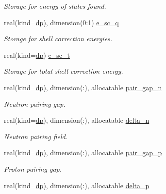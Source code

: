 \begin{DoxyCompactItemize}
\begin{DoxyCompactList}\small\item\em Storage for energy of states found. \end{DoxyCompactList}\item 
real(kind=\mbox{\hyperlink{namespaceparameters_a52f8c6351fd79345d8811e065bcbbb37}{dp}}), dimension(0\+:1) \mbox{\hyperlink{group__STRUTINSKY_ga8f402c8fe224c0fa1965b57701b6e597}{e\+\_\+sc\+\_\+q}}
\begin{DoxyCompactList}\small\item\em Storage for shell correction energies. \end{DoxyCompactList}\item 
real(kind=\mbox{\hyperlink{namespaceparameters_a52f8c6351fd79345d8811e065bcbbb37}{dp}}) \mbox{\hyperlink{group__STRUTINSKY_ga48fd0dbdf687c86420599443535e70c8}{e\+\_\+sc\+\_\+t}}
\begin{DoxyCompactList}\small\item\em Storage for total shell correction energy. \end{DoxyCompactList}\item 
real(kind=\mbox{\hyperlink{namespaceparameters_a52f8c6351fd79345d8811e065bcbbb37}{dp}}), dimension(\+:), allocatable \mbox{\hyperlink{group__PAIRING_ga2017e6d9cb3446579e4231db5ee50d0c}{pair\+\_\+gap\+\_\+n}}
\begin{DoxyCompactList}\small\item\em Neutron pairing gap. \end{DoxyCompactList}\item 
real(kind=\mbox{\hyperlink{namespaceparameters_a52f8c6351fd79345d8811e065bcbbb37}{dp}}), dimension(\+:), allocatable \mbox{\hyperlink{group__PAIRING_ga1a7cf61c64e34d8c4ff1348bea510826}{delta\+\_\+n}}
\begin{DoxyCompactList}\small\item\em Neutron pairing field. \end{DoxyCompactList}\item 
real(kind=\mbox{\hyperlink{namespaceparameters_a52f8c6351fd79345d8811e065bcbbb37}{dp}}), dimension(\+:), allocatable \mbox{\hyperlink{group__PAIRING_ga80c6085ca6be5adceadc0f7167218231}{pair\+\_\+gap\+\_\+p}}
\begin{DoxyCompactList}\small\item\em Proton pairing gap. \end{DoxyCompactList}\item 
real(kind=\mbox{\hyperlink{namespaceparameters_a52f8c6351fd79345d8811e065bcbbb37}{dp}}), dimension(\+:), allocatable \mbox{\hyperlink{group__PAIRING_gadffdf74625256112759c5d17e8cfeafc}{delta\+\_\+p}}

\end{DoxyCompactItemize}
